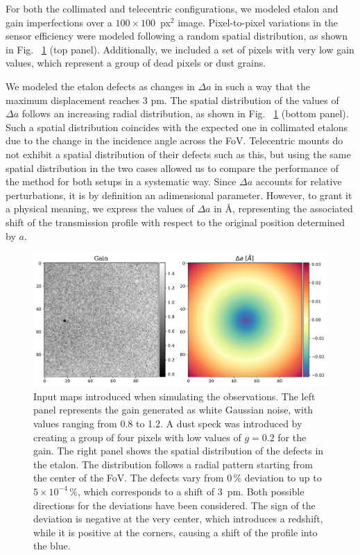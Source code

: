 For both the collimated and telecentric configurations, we modeled etalon and gain imperfections over a $100\times100$~px$^2$ image. Pixel-to-pixel variations in the sensor efficiency were modeled following a random spatial distribution, as shown in Fig.~ \ref{fig_etalon_corr: Inputs} (top panel). Additionally, we included a set of pixels with very low gain values, which represent a group of dead pixels or dust grains.

We modeled the etalon defects as changes in $\Delta a$ in such a way that the maximum displacement reaches $3$ pm. The spatial distribution of the values of  $\Delta a $ follows an increasing radial distribution, as shown in Fig.~ \ref{fig_etalon_corr: Inputs} (bottom panel). Such a spatial distribution coincides with the expected one in collimated etalons due to the change in the incidence angle across the FoV. Telecentric mounts do not exhibit a spatial distribution of their defects such as this, but using the same spatial distribution in the two cases allowed us to compare the performance of the method for both setups in a systematic way. Since $\Delta a$ accounts for relative perturbations, it is by definition an adimensional parameter. However, to grant it a physical meaning, we express the values of $\Delta a$ in \r{A}, representing the associated shift of the transmission profile with respect to the original position determined by $a$.

\begin{figure}
  \centering
    \includegraphics[width=\textwidth]{figures/EtalonPaper/Gain_Da_Inputs.pdf}
    \caption{
      Input maps introduced when simulating the observations. The left panel represents the gain generated as white Gaussian noise, with values ranging from 0.8 to 1.2. A dust speck was introduced by creating a group of four pixels with low values of $g=0.2$ for the gain. The right panel shows the spatial distribution of the defects in the etalon. The distribution follows a radial pattern starting from the center of the FoV. The defects vary from $0\,\%$ deviation to up to $5\times 10 ^{-4}\,\%$, which corresponds to a shift of 3~pm. Both possible directions for the deviations have been considered. The sign of the deviation is negative at the very center, which introduces a redshift, while it is positive at the corners, causing a shift of the profile into the blue.
      \label{fig_etalon_corr: Inputs}}
\end{figure}

